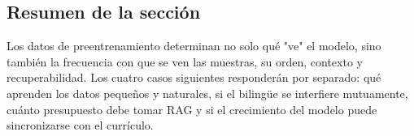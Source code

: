 \subsection{Resumen de la sección}

Los datos de preentrenamiento determinan no solo qué "ve" el modelo, sino también la frecuencia con que se ven las muestras, su orden, contexto y recuperabilidad. Los cuatro casos siguientes responderán por separado: qué aprenden los datos pequeños y naturales, si el bilingüe se interfiere mutuamente, cuánto presupuesto debe tomar RAG y si el crecimiento del modelo puede sincronizarse con el currículo.
